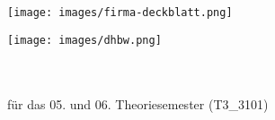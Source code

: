 


\begin{titlepage}
    
    \begin{center}
        \begin{minipage}[]{0.49\textwidth}
            \begin{flushleft}
                \texttt{[image: images/firma-deckblatt.png]}
            \end{flushleft}
        \end{minipage}
        \begin{minipage}[]{0.49\textwidth}
            \begin{flushright}
                \texttt{[image: images/dhbw.png]}
            \end{flushright}
        \end{minipage}
    \end{center}
    
    \enlargethispage{20mm}
    
    \begin{center}
        \vspace*{6mm}	{\arbeit}\\
        \doublespacing
        \vspace*{12mm}	{\LARGE\textbf{{\titel}}}\\
        \onehalfspacing
        \vspace*{24mm}	für das 05. und 06. Theoriesemester (T3\_3101)\\
        \vspace*{3mm}		\langartikelstudiengang{} \langstudiengang{} \textbf{\studiengang}\\
        \vspace*{3mm}		\langanderdh{} \dhbw\\
        \vspace*{7mm}	\langvon\\
        \vspace*{3mm}		{\large\textbf \autor}\\
        \vspace*{7mm}	\datumAbgabe\\
    \end{center}
    

\end{titlepage}
